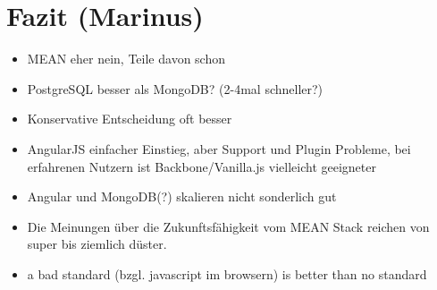 \chapter{Fazit (Marinus)}\label{fazit-marinus}

\begin{itemize}
\itemsep1pt\parskip0pt
\item
  MEAN eher nein, Teile davon schon
\item
  PostgreSQL besser als MongoDB? (2-4mal schneller?)
\item
  Konservative Entscheidung oft besser
\item
  AngularJS einfacher Einstieg, aber Support und Plugin Probleme, bei
  erfahrenen Nutzern ist Backbone/Vanilla.js vielleicht geeigneter
\item
  Angular und MongoDB(?) skalieren nicht sonderlich gut
\item
  Die Meinungen über die Zukunftsfähigkeit vom MEAN Stack reichen von
  super bis ziemlich düster.
\item
  a bad standard (bzgl. javascript im browsern) is better than no
  standard
\end{itemize}